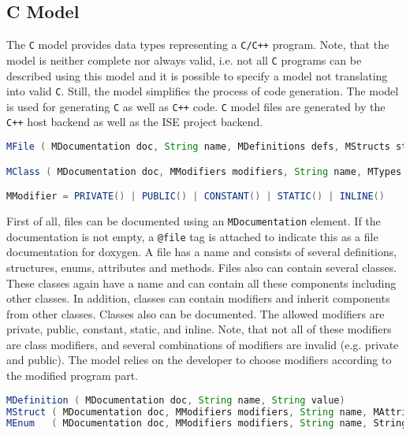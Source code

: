 \documentclass{report}
\begin{document}
\subsection{C Model}
\label{sec:cmodel}
The \texttt{C} model provides data types representing a \texttt{C/C++} program. Note, that the model is neither complete nor always valid, i.e. not all \texttt{C} programs can be described using this model and it is possible to specify a model not translating into valid \texttt{C}. Still, the model simplifies the process of code generation. The model is used for generating \texttt{C} as well as \texttt{C++} code. \texttt{C} model files are generated by the \texttt{C++} host backend as well as the ISE project backend.

\begin{lstlisting}[language=java, breaklines=true]
MFile ( MDocumentation doc, String name, MDefinitions defs, MStructs structs, MEnums enums, MAttributes attributes, MMethods methods, MClasses classes )

MClass ( MDocumentation doc, MModifiers modifiers, String name, MTypes extend, MStructs structs, MEnums enums, MAttributes attributes, MMethods methods, MClasses nested )

MModifier = PRIVATE() | PUBLIC() | CONSTANT() | STATIC() | INLINE()
\end{lstlisting}

First of all, files can be documented using an \texttt{MDocumentation} element. If the documentation is not empty, a \texttt{@file} tag is attached to indicate this as a file documentation for doxygen.  A file has a name and consists of several definitions, structures, enums, attributes and methods. Files also can contain several classes. These classes again have a name and can contain all these components including other classes. In addition, classes can contain modifiers and inherit components from other classes. Classes also can be documented.
The allowed modifiers are private, public, constant, static, and inline. Note, that not all of these modifiers are class modifiers, and several combinations of modifiers are invalid (e.g. private and public). The model relies on the developer to choose modifiers according to the modified program part.

\begin{lstlisting}[language=java, breaklines=true]
MDefinition ( MDocumentation doc, String name, String value)
MStruct ( MDocumentation doc, MModifiers modifiers, String name, MAttributes attributes )
MEnum   ( MDocumentation doc, MModifiers modifiers, String name, Strings values )
\end{lstlisting}
\end{document}
